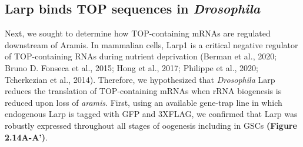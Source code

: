 \documentclass[12pt,oneside]{reedthesis}
\begin{document}
\setlength\parindent{24pt}

\textbf{\hfill\break
}

\hypertarget{larp-binds-top-sequences-in-drosophila}{%
\subsection{\texorpdfstring{Larp binds TOP sequences in \emph{Drosophila}}{Larp binds TOP sequences in Drosophila}}\label{larp-binds-top-sequences-in-drosophila}}

Next, we sought to determine how TOP-containing mRNAs are regulated downstream of Aramis. In mammalian cells, Larp1 is a critical negative regulator of TOP-containing RNAs during nutrient deprivation (Berman et al., 2020; Bruno D. Fonseca et al., 2015; Hong et al., 2017; Philippe et al., 2020; Tcherkezian et al., 2014). Therefore, we hypothesized that \emph{Drosophila} Larp reduces the translation of TOP-containing mRNAs when rRNA biogenesis is reduced upon loss of \emph{aramis}. First, using an available gene-trap line in which endogenous Larp is tagged with GFP and 3XFLAG, we confirmed that Larp was robustly expressed throughout all stages of oogenesis including in GSCs \textbf{(Figure 2.14A-A')}.
\end{document}
